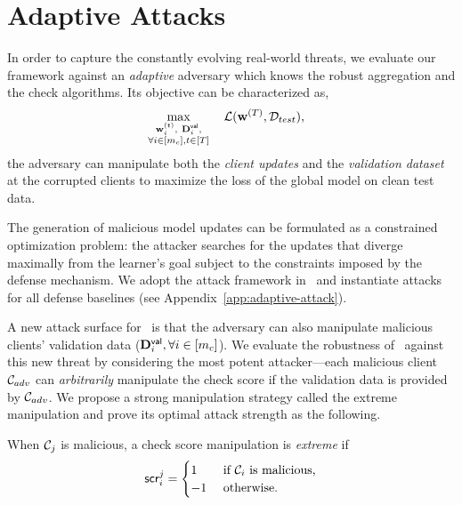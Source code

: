 \section{Adaptive Attacks}
\label{sec:adaptiveattack}

In order to capture the constantly evolving real-world threats, we evaluate our framework against an \emph{adaptive} adversary which knows the robust aggregation and the check algorithms. Its objective can be characterized as,
\begin{align}
\label{obj:adaptiveadv}
    & \max_{\substack{\bfw^{(t)}_i, \ \bfD^{\msf{val}}_i, \\ \forall i\in[\cor], t\in[T]}}\ \ \  \calL(\bfw^{(T)}, \calD_{test}),
\end{align}
\ie the adversary can manipulate both the \emph{client updates} and the \emph{validation dataset} at the corrupted clients to maximize the loss of the global model on clean test data. 

 The generation of malicious model updates can be formulated as a constrained optimization problem: the attacker searches for the updates that diverge maximally from the learner's goal subject to the constraints imposed by the defense mechanism. We adopt the attack framework in~\citet{fang2020local} and instantiate attacks for all defense baselines (see Appendix~\ref{app:adaptive-attack}).

A new attack surface for \ours\ is that the adversary can also manipulate malicious clients' validation data (\ie $\mathbf{D}^{\mathsf{val}}_i, \forall i \in [m_c]$). 
We evaluate the robustness of \ours\ against this new threat by considering the most potent attacker---each malicious client $\mathcal{C}_{adv}$ can \emph{arbitrarily} manipulate the check score if the validation data is provided by $\mathcal{C}_{adv}$. 
We propose a strong manipulation strategy called the extreme manipulation and prove its optimal attack strength as the following. 

\begin{definition}
\label{def:optimalattack}
When $\mathcal{C}_{j}$ is malicious, a check score manipulation is \emph{extreme} if
\begin{equation}
\label{eqn:extreme}
\score{i}{j} =
\begin{cases}
1 &\mbox{ if $\calC_i$ is malicious,}\\
-1 &\mbox{ otherwise.}
\end{cases}
\end{equation}
\end{definition}

